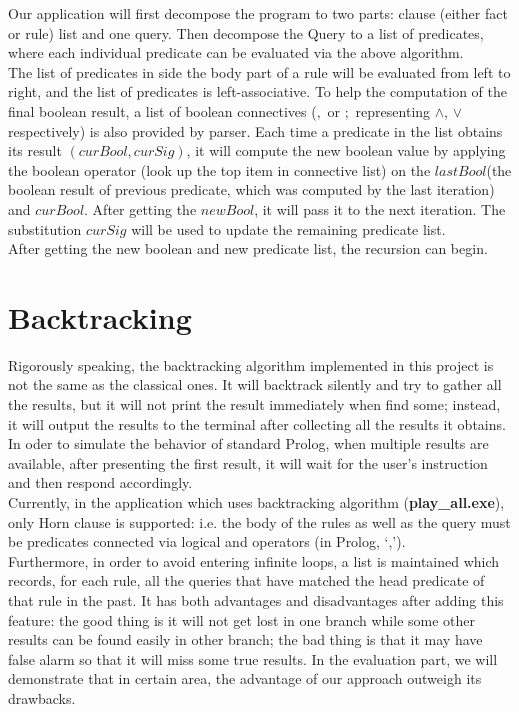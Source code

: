 \documentclass[11pt,a4paper]{report}
\begin{document}
Our application will first decompose the program to two parts: clause (either fact or rule) list and one query. Then decompose the Query to a list of predicates, where each individual predicate can be evaluated via the above algorithm. \\

The list of predicates in side the body part of a rule will be evaluated from left to right, and the list of predicates is left-associative. To help the computation of the final boolean result, a list of boolean connectives ($,$ or $;$ representing $\land$, $\lor$ respectively) is also provided by parser. Each time a predicate in the list obtains its result $(curBool,curSig)$, it will compute the new boolean value by applying the boolean operator (look up the top item in connective list) on the $lastBool$(the boolean result of previous predicate, which was computed by the last iteration) and $curBool$. After getting the $newBool$, it will pass it to the next iteration. The substitution $curSig$ will be used to update the remaining predicate list. \\

After getting the new boolean and new predicate list, the recursion can begin.

\section*{Backtracking}
Rigorously speaking, the backtracking algorithm implemented in this project is not the same as the classical ones. It will backtrack silently and try to
gather all the results, but it will not print the result immediately when find some; instead, it will output the results to the terminal after collecting all the results it obtains. In oder to simulate the behavior of standard Prolog, when multiple results are available, after presenting the first result, it will wait for the user's instruction and then respond accordingly.\\

Currently, in the application which uses backtracking algorithm (\textbf{play\_all.exe}), only Horn clause is supported: i.e. the body of the rules as well as the query must be predicates connected via logical and operators (in Prolog, `,').\\ Furthermore, in order to avoid entering infinite loops, a list is maintained which records, for each rule, all the queries that have matched the head predicate of that rule in the past. It has both advantages and disadvantages after adding this feature: the good thing is it will not get lost in one branch while some other results can be found easily in other branch; the bad thing is that it may have false alarm so that it will miss some true results. In the evaluation part, we will demonstrate that in certain area, the advantage of our approach outweigh its drawbacks.\\
\end{document}
